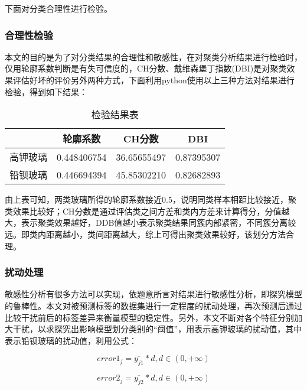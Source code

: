 下面对分类合理性进行检验。

\subsubsection{合理性检验}

本文的目的是为了对分类结果的合理性和敏感性，在对聚类分析结果进行检验时，仅用轮廓系数判断是有失可信度的，CH分数、戴维森堡丁指数(DBI)是对聚类效果评估好坏的评价另外两种方式，下面利用python使用以上三种方法对结果进行检验，得到如下结果：


\begin{table}[H]
	\centering
	\begin{tabular}{c c c c} 
        \toprule[1.5pt]
	    & 轮廓系数 & CH分数 & DBI \\
	    \toprule[1.5pt]
	    高钾玻璃 & 0.448406754 & 36.65655497 & 0.87395307 \\
	    \midrule[1pt]
	    铅钡玻璃 & 0.446694394 & 45.85302210 & 0.82682893 \\
	    \toprule[1.5pt]
	\end{tabular}
\caption{检验结果表}
\end{table}


由上表可知，两类玻璃所得的轮廓系数接近0.5，说明同类样本相距比较接近，聚类效果比较好；CH分数是通过评估类之间方差和类内方差来计算得分，分值越大，表示聚类效果越好，DDB值越小表示聚类结果同簇内部紧密，不同簇分离较远。即类内距离越小，类间距离越大，综上可得出聚类效果较好，该划分方法合理。



\subsubsection{扰动处理}

敏感性分析有很多方法可以实现，依题意所言对结果进行敏感性分析，即探究模型的鲁棒性。本文对被预测标签的数据集进行一定程度的扰动处理，再次预测后通过比较干扰前后的标签差异来衡量模型的稳定性。另外，本文不断对各个特征分别加大干扰，以求探究出影响模型划分类别的“阈值”，用表示高钾玻璃的扰动值，其中表示铅钡玻璃的扰动值，利用公式：

\begin{equation}
    error{{1}_{j}}=\overline{{{y}_{j1}}}*d,d\in \left( 0,+\infty  \right)
\end{equation}

\begin{equation}
    error{{2}_{j}}=\overline{{{y}_{j2}}}*d,d\in \left( 0,+\infty  \right)
\end{equation}

